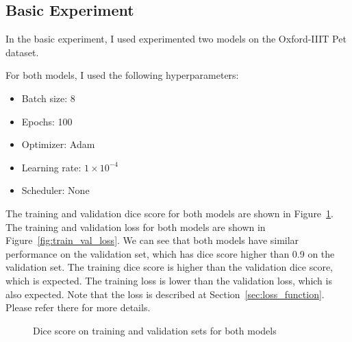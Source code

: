 \subsection{Basic Experiment}

In the basic experiment, I used experimented two models on the Oxford-IIIT Pet dataset.

For both models, I used the following hyperparameters:
\begin{itemize}
    \item Batch size: 8
    \item Epochs: 100
    \item Optimizer: Adam
    \item Learning rate: $1 \times 10^{-4}$
    \item Scheduler: None
\end{itemize}


The training and validation dice score for both models are shown in Figure~\ref{fig:train_val_dice}.
The training and validation loss for both models are shown in Figure~\ref{fig:train_val_loss}.
We can see that both models have similar performance on the validation set, which has dice score higher than 0.9 on the validation set.
The training dice score is higher than the validation dice score, which is expected.
The training loss is lower than the validation loss, which is also expected.
Note that the loss is described at Section~\ref{sec:loss_function}.
Please refer there for more details.

\def \unetexpdir {../log/u1/}
\def \resunetexpdir {../log/ru1/}
\begin{figure}[ht]
    \centering
    \caption{Dice score on training and validation sets for both models}
    \label{fig:train_val_dice}
\end{figure}

